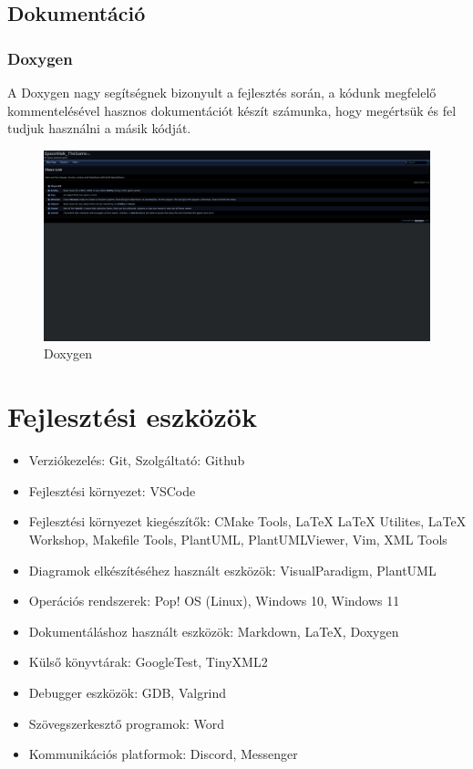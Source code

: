 \documentclass{scrarticle}
\begin{document}
\subsection{Dokumentáció}
\subsubsection{Doxygen}
A Doxygen nagy segítségnek bizonyult a fejlesztés során, a kódunk megfelelő kommentelésével hasznos dokumentációt készít számunka, hogy megértsük és fel tudjuk használni a másik kódját.
\begin{figure}[H]
    \includegraphics[width=1.0\columnwidth]{doxygen_sample.png}
    \caption{Doxygen}\label{fig:9}
\end{figure}

\section{Fejlesztési eszközök}
\begin{itemize}
    \item Verziókezelés: Git, Szolgáltató: Github
    \item Fejlesztési környezet: VSCode
    \item Fejlesztési környezet kiegészítők: CMake Tools, LaTeX LaTeX Utilites, LaTeX Workshop, Makefile Tools, PlantUML, PlantUMLViewer, Vim, XML Tools
    \item Diagramok elkészítéséhez használt eszközök: VisualParadigm, PlantUML
    \item Operációs rendszerek: Pop! OS (Linux), Windows 10, Windows 11
    \item Dokumentáláshoz használt eszközök: Markdown, LaTeX, Doxygen
    \item Külső könyvtárak: GoogleTest, TinyXML2
    \item Debugger eszközök: GDB, Valgrind
    \item Szövegszerkesztő programok: Word
    \item Kommunikációs platformok: Discord, Messenger
\end{itemize}
\end{document}
